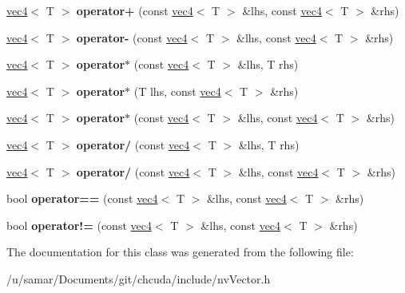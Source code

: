 \begin{DoxyCompactItemize}
\hyperlink{classnv_1_1vec4}{vec4}$<$ T $>$ {\bfseries operator+} (const \hyperlink{classnv_1_1vec4}{vec4}$<$ T $>$ \&lhs, const \hyperlink{classnv_1_1vec4}{vec4}$<$ T $>$ \&rhs)
\item 
\hypertarget{classnv_1_1vec4_a212f0e52efde08a0093d329fcdaad1a3}{}\label{classnv_1_1vec4_a212f0e52efde08a0093d329fcdaad1a3} 
\hyperlink{classnv_1_1vec4}{vec4}$<$ T $>$ {\bfseries operator-\/} (const \hyperlink{classnv_1_1vec4}{vec4}$<$ T $>$ \&lhs, const \hyperlink{classnv_1_1vec4}{vec4}$<$ T $>$ \&rhs)
\item 
\hypertarget{classnv_1_1vec4_ac8719df8fcfe7bd7c41d23018f00357f}{}\label{classnv_1_1vec4_ac8719df8fcfe7bd7c41d23018f00357f} 
\hyperlink{classnv_1_1vec4}{vec4}$<$ T $>$ {\bfseries operator$\ast$} (const \hyperlink{classnv_1_1vec4}{vec4}$<$ T $>$ \&lhs, T rhs)
\item 
\hypertarget{classnv_1_1vec4_a75870d1aa79efe3fb376f3b28052da06}{}\label{classnv_1_1vec4_a75870d1aa79efe3fb376f3b28052da06} 
\hyperlink{classnv_1_1vec4}{vec4}$<$ T $>$ {\bfseries operator$\ast$} (T lhs, const \hyperlink{classnv_1_1vec4}{vec4}$<$ T $>$ \&rhs)
\item 
\hypertarget{classnv_1_1vec4_a636e2ea72649260c3f304e6262456491}{}\label{classnv_1_1vec4_a636e2ea72649260c3f304e6262456491} 
\hyperlink{classnv_1_1vec4}{vec4}$<$ T $>$ {\bfseries operator$\ast$} (const \hyperlink{classnv_1_1vec4}{vec4}$<$ T $>$ \&lhs, const \hyperlink{classnv_1_1vec4}{vec4}$<$ T $>$ \&rhs)
\item 
\hypertarget{classnv_1_1vec4_a6b55551a180bd0607a442da9bb6ccea8}{}\label{classnv_1_1vec4_a6b55551a180bd0607a442da9bb6ccea8} 
\hyperlink{classnv_1_1vec4}{vec4}$<$ T $>$ {\bfseries operator/} (const \hyperlink{classnv_1_1vec4}{vec4}$<$ T $>$ \&lhs, T rhs)
\item 
\hypertarget{classnv_1_1vec4_a713208aac0e72cd0679403ee461d7b62}{}\label{classnv_1_1vec4_a713208aac0e72cd0679403ee461d7b62} 
\hyperlink{classnv_1_1vec4}{vec4}$<$ T $>$ {\bfseries operator/} (const \hyperlink{classnv_1_1vec4}{vec4}$<$ T $>$ \&lhs, const \hyperlink{classnv_1_1vec4}{vec4}$<$ T $>$ \&rhs)
\item 
\hypertarget{classnv_1_1vec4_af17126e65a8b03eaab3cc44f09d298d0}{}\label{classnv_1_1vec4_af17126e65a8b03eaab3cc44f09d298d0} 
bool {\bfseries operator==} (const \hyperlink{classnv_1_1vec4}{vec4}$<$ T $>$ \&lhs, const \hyperlink{classnv_1_1vec4}{vec4}$<$ T $>$ \&rhs)
\item 
\hypertarget{classnv_1_1vec4_a7ebfb7c5815e8cec967b56c867105d29}{}\label{classnv_1_1vec4_a7ebfb7c5815e8cec967b56c867105d29} 
bool {\bfseries operator!=} (const \hyperlink{classnv_1_1vec4}{vec4}$<$ T $>$ \&lhs, const \hyperlink{classnv_1_1vec4}{vec4}$<$ T $>$ \&rhs)
\end{DoxyCompactItemize}


The documentation for this class was generated from the following file\+:\begin{DoxyCompactItemize}
\item 
/u/samar/\+Documents/git/chcuda/include/nv\+Vector.\+h\end{DoxyCompactItemize}
